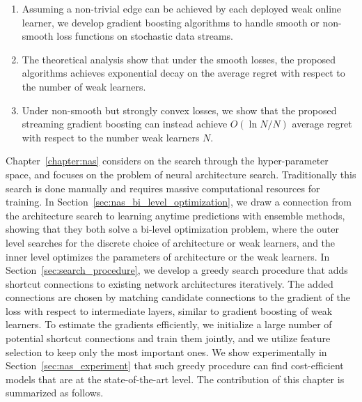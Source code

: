 \begin{enumerate}[resume]
\item Assuming a non-trivial edge can be achieved by each deployed weak online learner, we develop gradient boosting algorithms to handle smooth or non-smooth loss functions on stochastic data streams.
\item The theoretical analysis show that under the smooth losses, 
the proposed algorithms achieves exponential decay on the average regret with respect to the number of weak learners. 
\item Under non-smooth but strongly convex losses, we show that the proposed streaming gradient boosting can instead achieve $O(\ln N/N)$ average regret with respect to the number weak learners $N$. 
\end{enumerate}

Chapter~\ref{chapter:nas} considers on the search through the hyper-parameter space, and focuses on the problem of neural architecture search. 
Traditionally this search is done manually and requires massive computational resources for training. In Section~\ref{sec:nas_bi_level_optimization}, we draw a connection from the architecture search to learning anytime predictions with ensemble methods, showing that they both solve a bi-level optimization problem, where the outer level searches for the discrete choice of architecture or weak learners, and the inner level optimizes the parameters of architecture or the weak learners. In Section~\ref{sec:search_procedure}, we develop a greedy search procedure that adds shortcut connections to existing network architectures iteratively. The added connections are chosen by matching candidate connections to the gradient of the loss with respect to intermediate layers, similar to gradient boosting of weak learners. To estimate the gradients efficiently, we initialize a large number of potential shortcut connections and train them jointly, and we utilize feature selection to keep only the most important ones. We show experimentally in Section~\ref{sec:nas_experiment} that such greedy procedure can find cost-efficient models that are at the state-of-the-art level. 
The contribution of this chapter is summarized as follows.

